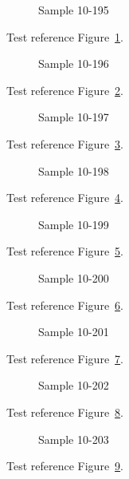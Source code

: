\begin{figure}[tbhp]
\caption{Sample 10-195}
\label{fig:sample-10-195}
\end{figure}

Test reference Figure~\ref{fig:sample-10-195}.

\begin{figure}[tbhp]
\caption{Sample 10-196}
\label{fig:sample-10-196}
\end{figure}

Test reference Figure~\ref{fig:sample-10-196}.

\begin{figure}[tbhp]
\caption{Sample 10-197}
\label{fig:sample-10-197}
\end{figure}

Test reference Figure~\ref{fig:sample-10-197}.

\begin{figure}[tbhp]
\caption{Sample 10-198}
\label{fig:sample-10-198}
\end{figure}

Test reference Figure~\ref{fig:sample-10-198}.

\begin{figure}[tbhp]
\caption{Sample 10-199}
\label{fig:sample-10-199}
\end{figure}

Test reference Figure~\ref{fig:sample-10-199}.

\begin{figure}[tbhp]
\caption{Sample 10-200}
\label{fig:sample-10-200}
\end{figure}

Test reference Figure~\ref{fig:sample-10-200}.

\begin{figure}[tbhp]
\caption{Sample 10-201}
\label{fig:sample-10-201}
\end{figure}

Test reference Figure~\ref{fig:sample-10-201}.

\begin{figure}[tbhp]
\caption{Sample 10-202}
\label{fig:sample-10-202}
\end{figure}

Test reference Figure~\ref{fig:sample-10-202}.

\begin{figure}[tbhp]
\caption{Sample 10-203}
\label{fig:sample-10-203}
\end{figure}

Test reference Figure~\ref{fig:sample-10-203}.

